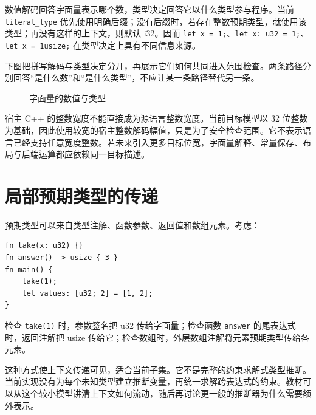 数值解码回答字面量表示哪个数，类型决定回答它以什么类型参与程序。当前 \texttt{literal\_type} 优先使用明确后缀；没有后缀时，若存在整数预期类型，就使用该类型；再没有这样的上下文，则默认 i32。因而 \lstinline[language=Rustless]|let x = 1;|、\lstinline[language=Rustless]|let x: u32 = 1;|、\lstinline[language=Rustless]|let x = 1usize;| 在类型决定上具有不同信息来源。

下图把拼写解码与类型决定分开，再展示它们如何共同进入范围检查。两条路径分别回答“是什么数”和“是什么类型”，不应让某一条路径替代另一条。
\begin{figure}[htbp]
\centering
{}
\caption{字面量的数值与类型}
\end{figure}

宿主 C++ 的整数宽度不能直接成为源语言整数宽度。当前目标模型以 32 位整数为基础，因此使用较宽的宿主整数解码幅值，只是为了安全检查范围。它不表示语言已经支持任意宽度整数。若未来引入更多目标位宽，字面量解释、常量保存、布局与后端运算都应依赖同一目标描述。

\section{局部预期类型的传递}
预期类型可以来自类型注解、函数参数、返回值和数组元素。考虑：
\begin{lstlisting}[language=Rustless]
fn take(x: u32) {}
fn answer() -> usize { 3 }
fn main() {
    take(1);
    let values: [u32; 2] = [1, 2];
}
\end{lstlisting}
检查 \lstinline[language=Rustless]|take(1)| 时，参数签名把 u32 传给字面量；检查函数 \lstinline[language=Rustless]|answer| 的尾表达式时，返回注解把 usize 传给它；检查数组时，外层数组注解将元素预期类型传给各元素。

这种方式使上下文传递可见，适合当前子集。它不是完整的约束求解式类型推断。当前实现没有为每个未知类型建立推断变量，再统一求解跨表达式的约束。教材可以从这个较小模型讲清上下文如何流动，随后再讨论更一般的推断器为什么需要额外表示。

